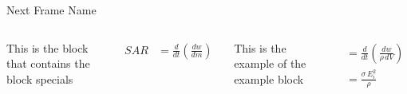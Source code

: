 \documentclass[7pt, aspectratio=169]{beamer}
\begin{document}
\begin{frame}{Next Frame Name}
    \begin{columns}
        \begin{block} This is the block that contains the block specials\\
        \end{block}
        
            \begin{align*}
            SAR &= \frac{d}{dt}\left(\frac{dw}{dm}\right) \\
            \end{align*}

        
        \begin{example} This is the example of the example block
        \end{example}
        
            \begin{align*}
            &= \frac{d}{dt}\left(\frac{dw}{\rho \, dV}\right) \\
            &= \frac{\sigma \, E_i^2}{\rho}
        \end{align*}
        
    \end{columns}
\end{frame}



\end{document}

